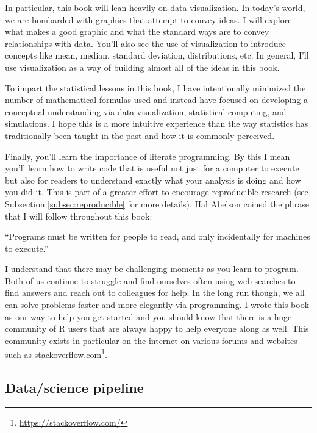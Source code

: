 \documentclass[
  12pt, krantz2,
]{krantz}
\renewenvironment{quote}{\begin{VF}}{\end{VF}}
\renewcommand{\href}[2]{#2\footnote{\url{#1}}}
\begin{document}
In particular, this book will lean heavily on data visualization. In today's world, we are bombarded with graphics that attempt to convey ideas. I will explore what makes a good graphic and what the standard ways are to convey relationships with data. You'll also see the use of visualization to introduce concepts like mean, median, standard deviation, distributions, etc. In general, I'll use visualization as a way of building almost all of the ideas in this book.

To impart the statistical lessons in this book, I have intentionally minimized the number of mathematical formulas used and instead have focused on developing a conceptual understanding via data visualization, statistical computing, and simulations. I hope this is a more intuitive experience than the way statistics has traditionally been taught in the past and how it is commonly perceived.

Finally, you'll learn the importance of literate programming. By this I mean you'll learn how to write code that is useful not just for a computer to execute but also for readers to understand exactly what your analysis is doing and how you did it. This is part of a greater effort to encourage reproducible research (see Subsection \ref{subsec:reproducible} for more details). Hal Abelson coined the phrase that I will follow throughout this book:

\begin{quote}
``Programs must be written for people to read, and only incidentally for machines to execute.''
\end{quote}

I understand that there may be challenging moments as you learn to program. Both of us continue to struggle and find ourselves often using web searches to find answers and reach out to colleagues for help. In the long run though, we all can solve problems faster and more elegantly via programming. I wrote this book as our way to help you get started and you should know that there is a huge community of R users that are always happy to help everyone along as well. This community exists in particular on the internet on various forums and websites such as \href{https://stackoverflow.com/}{stackoverflow.com}.

\hypertarget{subsec:pipeline}{%
\subsection{Data/science pipeline}\label{subsec:pipeline}}
\end{document}
